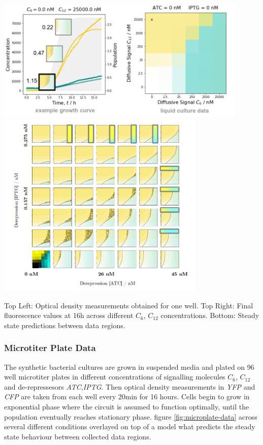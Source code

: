 \begin{Figure}

\includegraphics[width=120mm]{figures/microtiter.png}
\includegraphics[width=100mm]{figures/parameter-space.png}
\caption{Top Left: Optical density measurements obtained for one well.
Top Right: Final fluorescence values at 16h across different $C_6$, $C_{12}$
concentrations. Bottom: Steady state predictions between data regions.}
\label{fig:microplate-data}
\end{Figure}

\subsubsection{Microtiter Plate Data}
The synthetic bacterial cultures are grown in suspended media and plated on
96 well microtiter plates in different concentrations of signalling molecules
$C_6$, $C_{12}$ and de-repressesors \textit{ATC},\textit{IPTG}. Then
optical density measurements in \textit{YFP} and \textit{CFP} are taken
from each well every 20min for 16 hours. Cells begin to grow in exponential
phase where the circuit is assumed to function optimally, until the
population eventually reaches stationary phase. figure \ref{fig:microplate-data} across
several different conditions overlayed on top of a model what predicts
the steady state behaviour between collected data regions.

